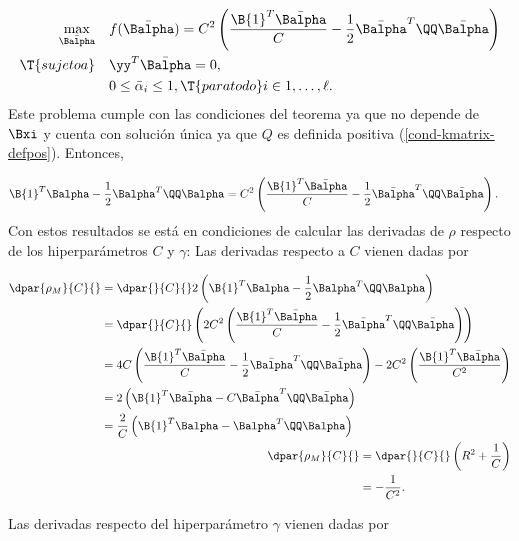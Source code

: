 \begin{align}
\begin{split}
    \max_{\bar{\Balpha}}\quad&
    f(\bar{\Balpha}) = C^2 \left( \frac{\B{1}^T\bar{\Balpha}}{C}
    -\frac{1}{2}\bar{\Balpha}^T\QQ\bar{\Balpha}\right)\\
    \T{sujeto a}\quad & \yy^T\bar{\Balpha} = 0, \\
    & 0\leq\bar{\alpha}_i\leq 1,
    \T{ para todo } i\in {1,\ldots,\ell }.
\end{split}\end{align}
Este problema cumple con las condiciones del teorema ya que
no depende de $\Bxi$ y cuenta con solución única
ya que $Q$ es definida positiva (\ref{cond-kmatrix-defpos}). Entonces,

\begin{align}
\label{eq:rmb-alpha-equiv}
  \B{1}^T\Balpha-\frac{1}{2}\Balpha^T\QQ\Balpha
  &= C^2\left(\frac{\B{1}^T\bar{\Balpha}}{C} -
  \frac{1}{2}\bar{\Balpha}^T\QQ\bar{\Balpha}\right).
\end{align}
Con estos resultados se está en condiciones de calcular las derivadas de
$\rho$ respecto de los hiperparámetros $C$ y $\gamma$:
Las derivadas respecto a $C$ vienen dadas por

\begin{align}
  \begin{aligned}
    \dpar{\rho_M}{C}{}
    &= \dpar{}{C}{}2\left(  \B{1}^T\Balpha-\frac{1}{2}\Balpha^T\QQ\Balpha \right) \\
    &= \dpar{}{C}{}\left( 2C^2\left(\frac{\B{1}^T\bar{\Balpha}}{C} -
    \frac{1}{2}\bar{\Balpha}^T\QQ\bar{\Balpha}\right)
    \right) \\
    &= 4C \left(\frac{\B{1}^T\bar{\Balpha}}{C} -
    \frac{1}{2}\bar{\Balpha}^T\QQ\bar{\Balpha}\right) - 2C^2 \left(\frac{\B{1}^T\bar{\Balpha}}{C^2} \right) \\
    &= 2\left(\B{1}^T\bar{\Balpha} - C \bar{\Balpha}^T\QQ\bar{\Balpha}\right) \\
    &= \frac{2}{C} \left(\B{1}^T\Balpha - \Balpha^T\QQ\Balpha\right)
  \end{aligned}
  \\
  \begin{aligned}
    \dpar{\rho_M}{C}{}
    &= \dpar{}{C}{} \left( R^2 + \frac{1}{C} \right) \\
    &= -\frac{1}{C^2}.
  \end{aligned}
\end{align}

Las derivadas respecto del hiperparámetro $\gamma$ vienen dadas por

